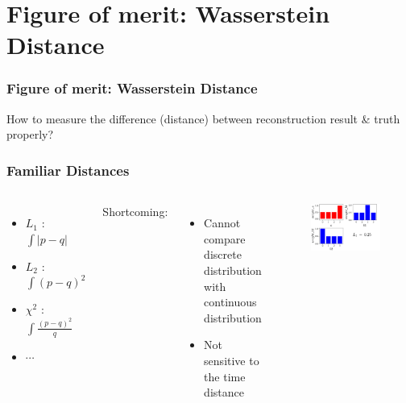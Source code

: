 \documentclass{beamer}
\begin{document}
\section{Figure of merit: Wasserstein Distance}
\begin{frame}
\frametitle{Figure of merit: Wasserstein Distance}
\begin{center}
    How to measure the difference (distance) between reconstruction result \& truth properly?
\end{center}
\end{frame}

\begin{frame}
\frametitle{Familiar Distances}
\begin{columns}
\begin{itemize}
    \item $L_{1}$ : $\int|p-q|$
    \item $L_{2}$ : $\int(p-q)^{2}$
    \item $\chi^{2}$ : $\int\frac{(p-q)^{2}}{q}$
    \item $\cdots$
\end{itemize}
Shortcoming:
\begin{itemize}
    \item Cannot compare discrete distribution with continuous distribution
    \item Not sensitive to the time distance 
\end{itemize}
\begin{figure}
    \centering
    \includegraphics[width=1.0\linewidth]{img/tab.png}
\end{figure}
\end{columns}
\end{frame}
\end{document}
